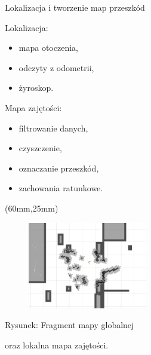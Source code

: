\documentclass[xcolor=x11names,compress]{beamer}
\renewcommand{\(}{\begin{columns}}
\renewcommand{\)}{\end{columns}}
\newcommand{\<}[1]{\begin{column}{#1}}
\renewcommand{\>}{\end{column}}
\begin{document}
\begin{frame}{Lokalizacja i tworzenie map przeszkód}

\alert{Lokalizacja:}
\begin{itemize}
\item mapa otoczenia,
\item odczyty z odometrii,
\item żyroskop.
\end{itemize}

\vspace{1cm}

\alert{Mapa zajętości:}
\begin{itemize}
\item filtrowanie danych,
\item czyszczenie,
\item oznaczanie przeszkód,
\item zachowania ratunkowe.
\end{itemize}



\begin{textblock*}{70mm}(60mm,25mm)%
    \begin{minipage}[l]{70mm}%

	\begin{figure}[h!]
	\centering
	\includegraphics[width=5.2cm]{../MSc/img/costmap}
	\end{figure}

	\hspace{1cm}\scriptsize \alert{Rysunek:} Fragment mapy globalnej

	\hspace{1cm}oraz lokalna mapa zajętości.
    \end{minipage}
\end{textblock*}

\end{frame}
\end{document}
